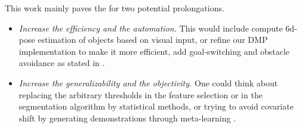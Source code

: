 \documentclass[conference]{IEEEtran}
\begin{document}
This work mainly paves the for two potential prolongations.
\begin{itemize}
    \item \textit{Increase the efficiency and the automation.} This would include compute 6d-pose estimation of objects based on visual input, or refine our DMP implementation to make it more efficient, add goal-switching and obstacle avoidance as stated in \cite{saveriano_dynamic_2021}. 
    
    \item  \textit{Increase the generalizability and the objectivity.} One could think about replacing the arbitrary thresholds in the feature selection or in the segmentation algorithm by statistical methods, or trying to avoid covariate shift by generating demonstrations through meta-learning \cite{yu_one-shot_2018}.

\end{itemize}




\vspace{12pt}
\end{document}

